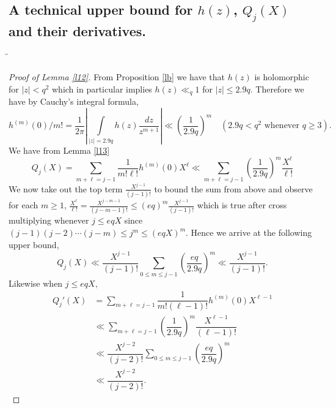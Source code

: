\documentclass[12pt]{amsart}
\numberwithin{equation}{section}
\theoremstyle{remark}
\theoremstyle{remark}
\theoremstyle{definition}
\begin{document}
\subsection{A technical upper bound for $h(z)$, $Q_j(X)$ and their derivatives.}
\u*
\begin{proof}[Proof of Lemma \ref{l12}]\label{lk}
From Proposition \ref{lb} we have that $h(z)$ is holomorphic for $|z|<q^2$ which in particular implies $h(z)\ll_{q} 1$ for $|z|\leqslant 2.9q$. Therefore we have by Cauchy's integral formula,
$$h^{(m)}(0)/m!=\dfrac{1}{2\pi}\left|\displaystyle\int\limits_{|z|=2.9q} h(z)\dfrac{dz}{z^{m+1}}\right|\ll \left( \dfrac{1}{2.9q}\right)^m \quad \left(2.9q<q^2\text{ whenever }q\geqslant 3\right).$$
We have from Lemma \ref{l13}
$$Q_j(X)=\displaystyle\sum\limits_{m+\ell=j-1}\dfrac{1}{m!\ell!}h^{(m)}(0) X^{\ell}\ll \displaystyle\sum\limits_{m+\ell=j-1} \left( \dfrac{1}{2.9q}\right)^m \dfrac{X^{\ell}}{\ell!}$$
We now take out the top term $\frac{X^{j-1}}{(j-1)!}$ to bound the sum from above and observe for each $m\geqslant 1$, $\frac{X^\ell}{\ell!}=\frac{X^{j-m-1}}{(j-m-1)!}\leqslant (eq)^m\frac{X^{j-1}}{(j-1)!}$ which is true after cross multiplying whenever $j\leqslant eqX$ since $ (j-1)(j-2)\cdots (j-m) \leqslant j^m \leqslant (eqX)^m$. Hence we arrive at the following upper bound,
$$Q_j(X)\ll \dfrac{X^{j-1}}{(j-1)!}\displaystyle\sum\limits_{0\leqslant m\leqslant j-1}  \left(\dfrac{eq}{2.9q}\right)^m\ll \dfrac{X^{j-1}}{(j-1)!}.$$
Likewise when $j\leqslant eqX,$
\begin{align}
\nonumber
Q_j'(X)&=\displaystyle\sum\limits_{m+\ell=j-1}\dfrac{1}{m!(\ell-1)!}h^{(m)}(0) X^{\ell-1}\\\
\nonumber
&\ll\displaystyle\sum\limits_{m+\ell=j-1} \left( \dfrac{1}{2.9q}\right)^m \dfrac{X^{\ell-1}}{(\ell-1)!}\\
\nonumber
&\ll \dfrac{X^{j-2}}{(j-2)!}\displaystyle\sum\limits_{0\leqslant m\leqslant j-1} \left(\dfrac{eq}{2.9q}\right)^m\\
\nonumber
&\ll \dfrac{X^{j-2}}{(j-2)!}.
\end{align}
\end{proof}
\end{document}
